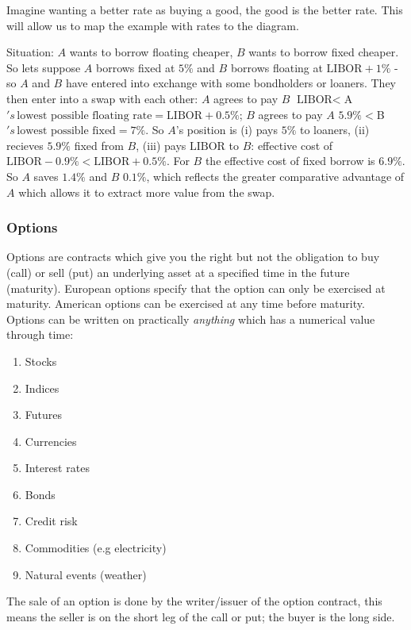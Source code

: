 \documentclass[9pt]{extarticle}
\begin{document}
Imagine wanting a better rate as buying a good, the good is the better rate. This will allow us to map the example with 
rates to the diagram.

Situation: $A$ wants to borrow floating cheaper, $B$ wants to borrow fixed cheaper. So lets suppose $A$ borrows fixed 
at $5\%$ and $B$ borrows floating at $\text{LIBOR} +1\%$ - so $A$ and $B$ have entered into 
exchange with some bondholders or loaners. They then enter into a swap with each other: $A$ 
agrees to pay $B$ $\text{LIBOR}<$A$'s\,\text{lowest possible floating rate} = \text{LIBOR}+0.5\%$; $B$  
agrees to pay $A$ $5.9\% < $B$'s\,\text{lowest possible fixed} = 7\%$. So $A$'s 
position is (i) pays $5\%$ to loaners, (ii) recieves $5.9\%$ fixed from $B$, (iii) 
pays $\text{LIBOR}$ to $B$: effective cost of $\text{LIBOR}-0.9\%<\text{LIBOR}+0.5\%$. 
For $B$ the effective cost of fixed borrow is $6.9\%$. So $A$ saves $1.4\%$ and $B$ $0.1\%$, which 
reflects the greater comparative advantage of $A$ which allows it to extract more value from the 
swap.

\subsubsection{Options}

Options are contracts which give you the right but not the obligation to buy (call) or 
sell (put) an underlying asset at a specified time in the future (maturity). 
European options specify that the option can only be exercised 
at maturity. American options can be exercised at any time before maturity. 
Options can be written on practically \textit{anything} which has a 
numerical value through time:
\begin{enumerate}
  \item Stocks
  \item Indices
  \item Futures
  \item Currencies
  \item Interest rates
  \item Bonds
  \item Credit risk 
  \item Commodities (e.g electricity)
  \item Natural events (weather)
\end{enumerate}
The 
sale of an option is done by the writer/issuer 
of the option contract, this means the seller is 
on the short leg of the call or put; the buyer is the long side. 
\end{document}
